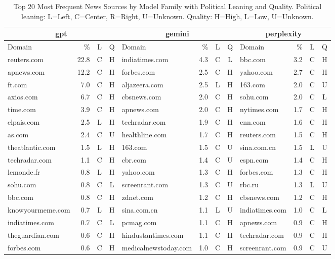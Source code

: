 \begin{table*}[htbp]
\centering
\caption{Top 20 Most Frequent News Sources by Model Family with Political Leaning and Quality. Political leaning: L=Left, C=Center, R=Right, U=Unknown. Quality: H=High, L=Low, U=Unknown.}
\label{tab:top_news_sources}
\begin{tabular}{lrcc|lrcc|lrcc}
\toprule
\multicolumn{4}{c|}{\textbf{gpt}} & \multicolumn{4}{c|}{\textbf{gemini}} & \multicolumn{4}{c}{\textbf{perplexity}} \\
\midrule
Domain & \% & L & Q & Domain & \% & L & Q & Domain & \% & L & Q \\
\midrule
reuters.com & 22.8 & C & H & indiatimes.com & 4.3 & C & L & bbc.com & 3.2 & C & H \\
apnews.com & 12.2 & C & H & forbes.com & 2.5 & C & H & yahoo.com & 2.7 & C & H \\
ft.com & 7.0 & C & H & aljazeera.com & 2.5 & L & H & 163.com & 2.0 & C & U \\
axios.com & 6.7 & C & H & cbsnews.com & 2.0 & C & H & sohu.com & 2.0 & C & L \\
time.com & 3.9 & C & H & apnews.com & 2.0 & C & H & nytimes.com & 1.7 & C & H \\
elpais.com & 2.5 & L & H & techradar.com & 1.9 & C & H & cnn.com & 1.6 & C & H \\
as.com & 2.4 & C & U & healthline.com & 1.7 & C & H & reuters.com & 1.5 & C & H \\
theatlantic.com & 1.5 & L & H & 163.com & 1.5 & C & U & sina.com.cn & 1.5 & L & U \\
techradar.com & 1.1 & C & H & cbr.com & 1.4 & C & U & espn.com & 1.4 & C & H \\
lemonde.fr & 0.8 & L & H & yahoo.com & 1.3 & C & H & forbes.com & 1.3 & C & H \\
sohu.com & 0.8 & C & L & screenrant.com & 1.3 & C & U & rbc.ru & 1.3 & L & U \\
bbc.com & 0.8 & C & H & zdnet.com & 1.2 & C & H & cbsnews.com & 1.2 & C & H \\
knowyourmeme.com & 0.7 & L & H & sina.com.cn & 1.1 & L & U & indiatimes.com & 1.0 & C & L \\
indiatimes.com & 0.7 & C & L & pcmag.com & 1.1 & C & H & apnews.com & 0.9 & C & H \\
theguardian.com & 0.6 & C & H & hindustantimes.com & 1.1 & C & H & techradar.com & 0.9 & C & H \\
forbes.com & 0.6 & C & H & medicalnewstoday.com & 1.0 & C & H & screenrant.com & 0.9 & C & U \\

\end{tabular}
\end{table*}
